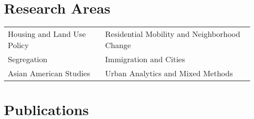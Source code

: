 \documentclass[11pt,letterpaper]{article}
\begin{document}
\section{Research Areas}
\begin{tabular}{@{}p{} p{}@{}}
Housing and Land Use Policy & Residential Mobility and Neighborhood Change\\
Segregation & Immigration and Cities\\
Asian American Studies & Urban Analytics and Mixed Methods
\end{tabular}

\section{Publications}
\end{document}
